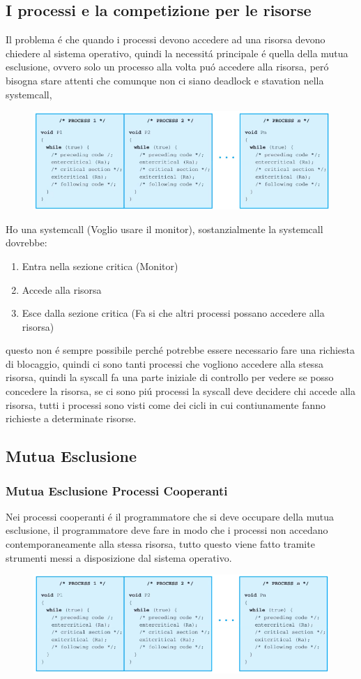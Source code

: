 \subsection{I processi e la competizione per le risorse}
Il problema é che quando i processi devono accedere ad una risorsa devono chiedere al sistema operativo, quindi la necessitá principale é quella
della mutua esclusione, ovvero solo un processo alla volta puó accedere alla risorsa, peró bisogna stare attenti che comunque non ci siano deadlock e stavation nella systemcall,
\begin{figure}[H]
    \centering
    \includegraphics[width=0.7\linewidth]{immagini/MutuaEsclusionePerProcessiInCompetizione}
\end{figure}
Ho una systemcall (Voglio usare il monitor), sostanzialmente la systemcall dovrebbe:
\begin{enumerate}
    \item Entra nella sezione critica (Monitor)
    \item Accede alla risorsa
    \item Esce dalla sezione critica (Fa si che altri processi possano accedere alla risorsa)
\end{enumerate}
questo non é sempre possibile perché potrebbe essere necessario fare una richiesta di blocaggio, quindi ci sono tanti processi che vogliono
accedere alla stessa risorsa, quindi la syscall fa una parte iniziale di controllo per vedere se posso concedere la risorsa, se ci sono
piú processi la syscall deve decidere chi accede alla risorsa, tutti i processi sono visti come dei cicli in cui contiunamente fanno richieste a
determinate risorse.
\subsection{Mutua Esclusione}
\subsubsection*{Mutua Esclusione Processi Cooperanti}
Nei processi cooperanti é il programmatore che si deve occupare della mutua esclusione, il programmatore deve fare in modo che i processi
non accedano contemporaneamente alla stessa risorsa, tutto questo viene fatto tramite strumenti messi a disposizione dal sistema operativo.
\begin{figure}[H]
    \centering
    \includegraphics[width=0.7\linewidth]{immagini/MutuaEsclusioneProcessiCooperanti}
\end{figure}
